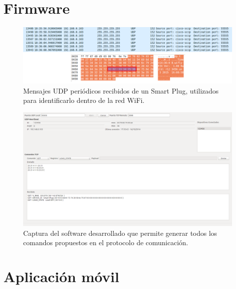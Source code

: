 \section{Firmware}
\label{sec:validacion_firmware}

\begin{figure}[h]
	\centering
	\includegraphics[width=12cm]{./Figures/4_1_2_mensajes_udp.png}
	\caption{Mensajes UDP periódicos recibidos de un Smart Plug, utilizados para identificarlo dentro de la red WiFi.}
	\label{fig:mensajes_udp}
\end{figure}

\begin{figure}[h]
	\centering
	\includegraphics[width=14cm]{./Figures/4_1_2_simulador_tcp.png}
	\caption{Captura del software desarrollado que permite generar todos los comandos propuestos en el protocolo de comunicación.}
	\label{fig:simulador_tcp}
\end{figure}

\section{Aplicación móvil}

